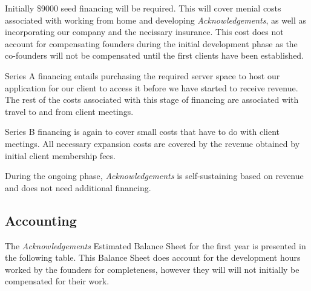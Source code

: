 Initially \$9000 seed financing will be required. This will cover menial costs associated with working from home and developing {\it Acknowledgements}, as well as incorporating our company and the necissary insurance. This cost does not account for compensating founders during the initial development phase as the co-founders will not be compensated until the first clients have been established.

Series A financing entails purchasing the required server space to host our application for our client to access it before we have started to receive revenue. The rest of the costs associated with this stage of financing are associated with travel to and from client meetings.

Series B financing is again to cover small costs that have to do with client meetings. All necessary expansion costs are covered by the revenue obtained by initial client membership fees.

During the ongoing phase, {\it Acknowledgements} is self-sustaining based on revenue and does not need additional financing.


\subsection{Accounting}
The {\it Acknowledgements} Estimated Balance Sheet for the first year is presented in the following table. This Balance Sheet does account for the development hours worked by the founders for completeness, however they will will not initially be compensated for their work.

